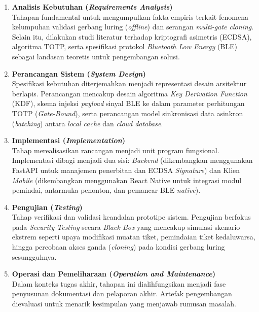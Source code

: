 \begin{enumerate}
    \item \textbf{Analisis Kebutuhan (\textit{Requirements Analysis})} \\
    Tahapan fundamental untuk mengumpulkan fakta empiris terkait fenomena kelumpuhan validasi gerbang luring (\textit{offline}) dan serangan \textit{multi-gate cloning}. Selain itu, dilakukan studi literatur terhadap kriptografi asimetris (ECDSA), algoritma TOTP, serta spesifikasi protokol \textit{Bluetooth Low Energy} (BLE) sebagai landasan teoretis untuk pengembangan solusi.

    \item \textbf{Perancangan Sistem (\textit{System Design})} \\
    Spesifikasi kebutuhan diterjemahkan menjadi representasi desain arsitektur berlapis. Perancangan mencakup desain algoritma \textit{Key Derivation Function} (KDF), skema injeksi \textit{payload} sinyal BLE ke dalam parameter perhitungan TOTP (\textit{Gate-Bound}), serta perancangan model sinkronisasi data asinkron (\textit{batching}) antara \textit{local cache} dan \textit{cloud database}.

    \item \textbf{Implementasi (\textit{Implementation})} \\
    Tahap merealisasikan rancangan menjadi unit program fungsional. Implementasi dibagi menjadi dua sisi: \textit{Backend} (dikembangkan menggunakan FastAPI untuk manajemen penerbitan dan ECDSA \textit{Signature}) dan Klien \textit{Mobile} (dikembangkan menggunakan React Native untuk integrasi modul pemindai, antarmuka penonton, dan pemancar BLE \textit{native}).

    \item \textbf{Pengujian (\textit{Testing})} \\
    Tahap verifikasi dan validasi keandalan prototipe sistem. Pengujian berfokus pada \textit{Security Testing} secara \textit{Black Box} yang mencakup simulasi skenario ekstrem seperti upaya modifikasi muatan tiket, pemindaian tiket kedaluwarsa, hingga percobaan akses ganda (\textit{cloning}) pada kondisi gerbang luring sesungguhnya.

    \item \textbf{Operasi dan Pemeliharaan (\textit{Operation and Maintenance})} \\
    Dalam konteks tugas akhir, tahapan ini dialihfungsikan menjadi fase penyusunan dokumentasi dan pelaporan akhir. Artefak pengembangan dievaluasi untuk menarik kesimpulan yang menjawab rumusan masalah.
\end{enumerate}

